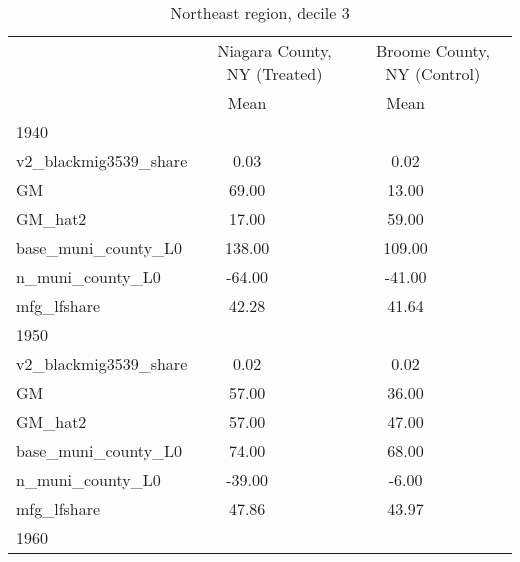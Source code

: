 \begin{table}[htbp]\centering
\def\sym#1{\ifmmode^{#1}\else\(^{#1}\)\fi}
\caption{Northeast region, decile 3 \label{tab1}}
\begin{tabular}{l*{2}{ccc}}
\toprule
                    &\multicolumn{3}{c}{Niagara County, NY (Treated)}&\multicolumn{3}{c}{Broome County, NY (Control)}\\
                    &        Mean&            &            &        Mean&            &            \\
\midrule
1940                &            &            &            &            &            &            \\
v2\_blackmig3539\_share&        0.03&            &            &        0.02&            &            \\
GM                  &       69.00&            &            &       13.00&            &            \\
GM\_hat2             &       17.00&            &            &       59.00&            &            \\
base\_muni\_county\_L0 &      138.00&            &            &      109.00&            &            \\
n\_muni\_county\_L0    &      -64.00&            &            &      -41.00&            &            \\
mfg\_lfshare         &       42.28&            &            &       41.64&            &            \\
\midrule
1950                &            &            &            &            &            &            \\
v2\_blackmig3539\_share&        0.02&            &            &        0.02&            &            \\
GM                  &       57.00&            &            &       36.00&            &            \\
GM\_hat2             &       57.00&            &            &       47.00&            &            \\
base\_muni\_county\_L0 &       74.00&            &            &       68.00&            &            \\
n\_muni\_county\_L0    &      -39.00&            &            &       -6.00&            &            \\
mfg\_lfshare         &       47.86&            &            &       43.97&            &            \\
\midrule
1960                &            &            &            &            &            &            \\

\end{tabular}
\end{table}
